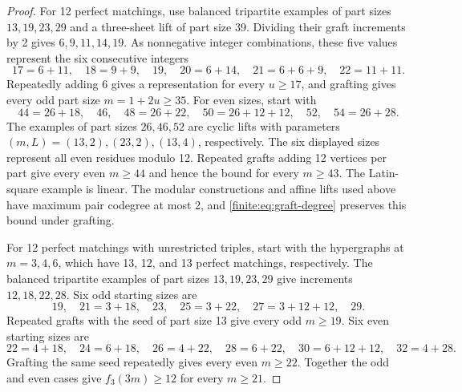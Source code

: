 \documentclass[10pt]{article}
\numberwithin{equation}{section}
\begin{document}
\begin{proof}
For 12 perfect matchings, use balanced tripartite examples of part sizes $13,19,23,29$ and a three-sheet lift of part size 39. Dividing their graft increments by 2 gives $6,9,11,14,19$. As nonnegative integer combinations, these five values represent the six consecutive integers
\[
 17=6+11,\quad18=9+9,\quad19,\quad20=6+14,\quad
 21=6+6+9,\quad22=11+11.
\]
Repeatedly adding 6 gives a representation for every $u\ge17$, and grafting gives every odd part size $m=1+2u\ge35$. For even sizes, start with
\[
 44=26+18,\quad46,\quad48=26+22,\quad50=26+12+12,
 \quad52,\quad54=26+28.
\]
The examples of part sizes $26,46,52$ are cyclic lifts with parameters $(m,L)=(13,2),(23,2),(13,4)$, respectively. The six displayed sizes represent all even residues modulo 12. Repeated grafts adding 12 vertices per part give every even $m\ge44$ and hence the bound for every $m\ge43$. The Latin-square example is linear. The modular constructions and affine lifts used above have maximum pair codegree at most 2, and \cref{finite:eq:graft-degree} preserves this bound under grafting.

For 12 perfect matchings with unrestricted triples, start with the hypergraphs at $m=3,4,6$, which have 13, 12, and 13 perfect matchings, respectively. The balanced tripartite examples of part sizes $13,19,23,29$ give increments $12,18,22,28$. Six odd starting sizes are
\[
 19,\quad21=3+18,\quad23,\quad25=3+22,\quad
 27=3+12+12,\quad29.
\]
Repeated grafts with the seed of part size 13 give every odd $m\ge19$. Six even starting sizes are
\[
 22=4+18,\quad24=6+18,\quad26=4+22,\quad28=6+22,
 \quad30=6+12+12,\quad32=4+28.
\]
Grafting the same seed repeatedly gives every even $m\ge22$. Together the odd and even cases give $f_3(3m)\ge12$ for every $m\ge21$.
\end{proof}
\end{document}
